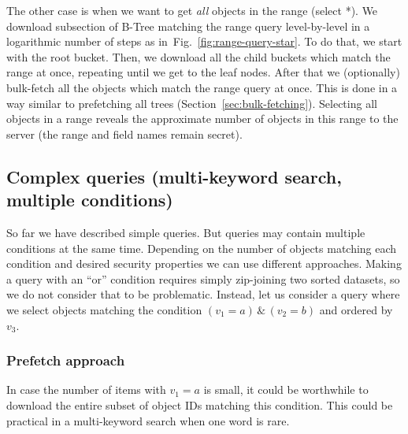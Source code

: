 \documentclass[notitlepage,longbibliography]{revtex4-1}
\newcommand{\figref}[1]{Fig.~\ref{#1}}
\begin{document}
The other case is when we want to get \emph{all} objects in the range (select *).
We download subsection of B-Tree matching the range query level-by-level in a logarithmic number of steps as in~\figref{fig:range-query-star}.
To do that, we start with the root bucket.
Then, we download all the child buckets which match the range at once, repeating until we get to the leaf nodes.
After that we (optionally) bulk-fetch all the objects which match the range query at once.
This is done in a way similar to prefetching all trees (Section~\ref{sec:bulk-fetching}).
Selecting all objects in a range reveals the approximate number of objects in this range to the server (the range and field names remain secret).

\subsection{Complex queries (multi-keyword search, multiple conditions)}

So far we have described simple queries.
But queries may contain multiple conditions at the same time.
Depending on the number of objects matching each condition and desired security properties we can use different approaches.
Making a query with an ``or'' condition requires simply zip-joining two sorted datasets, so we do not consider that to be problematic.
Instead, let us consider a query where we select objects matching the condition $(v_1 = a) \,\&\, (v_2 = b)$ and ordered by $v_3$.

\subsubsection{Prefetch approach}
\label{sec:prefetch}
%

In case the number of items with $v_1=a$ is small, it could be worthwhile to download the entire subset of object IDs matching this condition.
This could be practical in a multi-keyword search when one word is rare.
\end{document}
